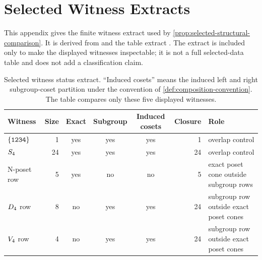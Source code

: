 \section{Selected Witness Extracts}
\label{app:selected-witness-tables}

This appendix gives the finite witness extract used by \cref{prop:selected-structural-comparison}. It is derived from  and the table extract . The extract is included only to make the displayed witnesses inspectable; it is not a full selected-data table and does not add a classification claim.

\begin{table}[htbp]
\centering
\small
\begin{tabular}{@{}p{}rccc r p{}@{}}
\toprule
Witness & Size & Exact & Subgroup & Induced cosets & Closure & Role \\
\midrule
\(\{\texttt{1234}\}\) & 1 & yes & yes & yes & 1 & overlap control \\
\(S_4\) & 24 & yes & yes & yes & 24 & overlap control \\
N-poset row & 5 & yes & no & no & 5 & exact poset cone outside subgroup rows \\
\(D_4\) row & 8 & no & yes & yes & 24 & subgroup row outside exact poset cones \\
\(V_4\) row & 4 & no & yes & yes & 24 & subgroup row outside exact poset cones \\
\bottomrule
\end{tabular}
\caption{Selected witness status extract. ``Induced cosets'' means the induced left and right subgroup-coset partition under the convention of \cref{def:composition-convention}. The table compares only these five displayed witnesses.}
\label{tab:appendix-selected-witness-status}
\end{table}

